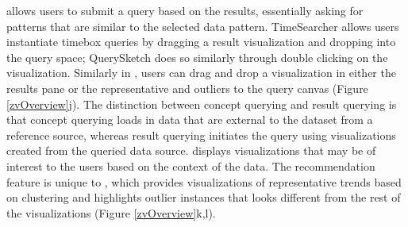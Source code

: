  allows users to submit a query based on the results, essentially asking for patterns that are similar to the selected data pattern. TimeSearcher allows users instantiate timebox queries by dragging a result visualization and dropping into the query space; QuerySketch does so similarly through double clicking on the visualization. Similarly in \zv, users can drag and drop a visualization in either the results pane or the representative and outliers to the query canvas (Figure \ref{zvOverview}j). The distinction between concept querying and result querying is that concept querying loads in data that are external to the dataset from a reference source, whereas result querying initiates the query using visualizations created from the queried data source.
 displays visualizations that may be of interest to the users based on the context of the data. The recommendation feature is unique to \zv, which provides visualizations of representative trends based on clustering and highlights outlier instances that looks different from the rest of the visualizations (Figure \ref{zvOverview}k,l).
